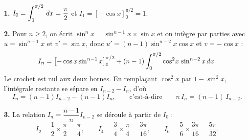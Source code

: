 \begin{corrige}
\textbf{1.} $I_{0} = \displaystyle\int_{0}^{\pi/2}\,dx = \frac{\pi}{2}$ et
$I_{1} = \left[-\cos x\right]_{0}^{\pi/2} = 1$.

\textbf{2.} Pour $n \geq 2$, on écrit $\sin^{n}x = \sin^{n-1}x \times \sin x$
et on intègre par parties avec $u = \sin^{n-1}x$ et $v' = \sin x$, donc
$u' = (n-1)\sin^{n-2}x\cos x$ et $v = -\cos x$ :
\[
  I_{n} = \left[-\cos x \sin^{n-1}x\right]_{0}^{\pi/2}
        + (n-1)\int_{0}^{\pi/2}\cos^{2}\!x\,\sin^{n-2}x \,dx .
\]
Le crochet est nul aux deux bornes. En remplaçant $\cos^{2}x$ par
$1-\sin^{2}x$, l'intégrale restante se sépare en $I_{n-2}-I_{n}$, d'où
\[
  I_{n} = (n-1)I_{n-2} - (n-1)I_{n},
  \qquad\text{c'est-à-dire}\qquad
  n\,I_{n} = (n-1)\,I_{n-2}.
\]

\textbf{3.} La relation $I_{n} = \dfrac{n-1}{n}I_{n-2}$ se déroule à partir de
$I_{0}$ :
\[
  I_{2} = \frac12 \times \frac{\pi}{2} = \frac{\pi}{4},
  \qquad
  I_{4} = \frac34 \times \frac{\pi}{4} = \frac{3\pi}{16},
  \qquad
  I_{6} = \frac56 \times \frac{3\pi}{16} = \frac{5\pi}{32}.
\]
\end{corrige}


